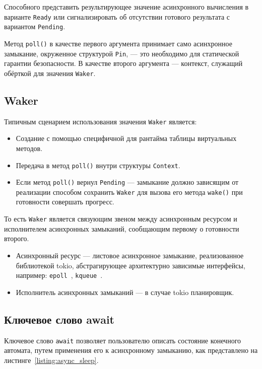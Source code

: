Способного представить результирующее значение асинхронного вычисления в варианте \verb|Ready| или сигнализировать об отсутствии готового результата с вариантом \verb|Pending|.

Метод \verb|poll()| в качестве первого аргумента принимает само асинхронное замыкание, окруженное структурой \verb|Pin|, --- это необходимо для статической гарантии безопасности. В качестве второго аргумента --- контекст, служащий обёрткой для значения \verb|Waker|.

\subsection{Waker}
Типичным сценарием использования значения \verb|Waker| является:

\begin{itemize}
    \item Создание с помощью специфичной для рантайма таблицы виртуальных методов.
    \item Передача в метод \verb|poll()| внутри структуры \verb|Context|.
    \item Если метод \verb|poll()| вернул \verb|Pending| --- замыкание должно зависящим от реализации способом сохранить \verb|Waker| для вызова его метода \verb|wake()| при готовности совершать прогресс.
\end{itemize}

То есть \verb|Waker| является связующим звеном между асинхронным ресурсом и исполнителем асинхронных замыканий, сообщающим первому о готовности второго.

\begin{itemize}
    \item Асинхронный ресурс --- листовое асинхронное замыкание, реализованное библиотекой tokio, абстрагирующее архитектурно зависимые интерфейсы, например: \verb|epoll|~\cite{epollLib}, \verb|kqueue|~\cite{kqueue}.
    \item Исполнитель асинхронных замыканий --- в случае tokio планировщик.
\end{itemize}

\subsection{Ключевое слово await}

Ключевое слово \verb|await| позволяет пользователю описать состояние конечного автомата, путем применения его к асинхронному замыканию, как представлено на листинге~\ref{listing:async_sleep}.

